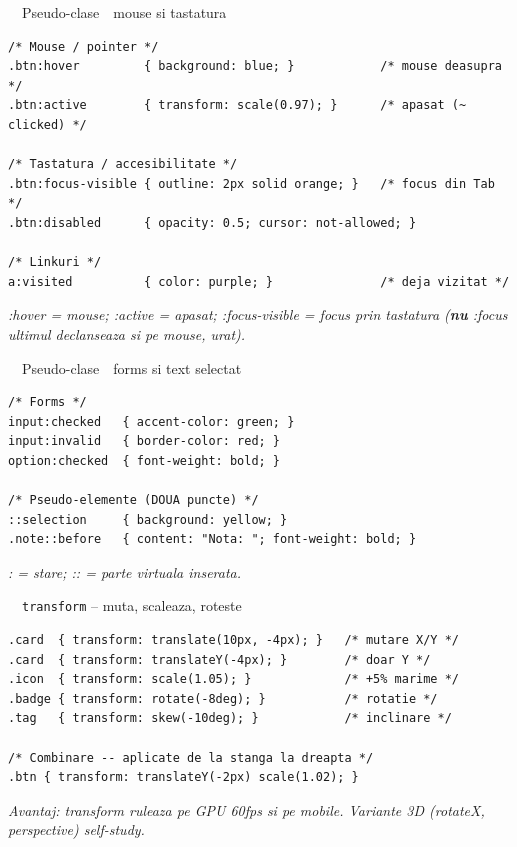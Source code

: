 \documentclass[aspectratio=169,11pt]{beamer}
\newcommand{\code}[1]{{\ttfamily\small\color{accent!85!black}#1}}
\begin{document}
\begin{frame}[fragile]{\textcolor{themeCss}{\faPaintBrush}\ \ Pseudo-clase \,\textendash\, mouse si tastatura}
\vspace{4pt}
\begin{lstlisting}[style=css, basicstyle=\ttfamily\scriptsize]
/* Mouse / pointer */
.btn:hover         { background: blue; }            /* mouse deasupra */
.btn:active        { transform: scale(0.97); }      /* apasat (~ clicked) */

/* Tastatura / accesibilitate */
.btn:focus-visible { outline: 2px solid orange; }   /* focus din Tab */
.btn:disabled      { opacity: 0.5; cursor: not-allowed; }

/* Linkuri */
a:visited          { color: purple; }               /* deja vizitat */
\end{lstlisting}

\vspace{2pt}
{\footnotesize\color{textDim}\itshape \code{:hover} = mouse; \code{:active} = apasat; \code{:focus-visible} = focus prin tastatura (\textbf{nu} \code{:focus} \textendash{} ultimul declanseaza si pe mouse, urat).}
\end{frame}

\begin{frame}[fragile]{\textcolor{themeCss}{\faPaintBrush}\ \ Pseudo-clase \,\textendash\, forms si text selectat}
\vspace{6pt}
\begin{lstlisting}[style=css, basicstyle=\ttfamily\scriptsize]
/* Forms */
input:checked   { accent-color: green; }
input:invalid   { border-color: red; }
option:checked  { font-weight: bold; }

/* Pseudo-elemente (DOUA puncte) */
::selection     { background: yellow; }
.note::before   { content: "Nota: "; font-weight: bold; }
\end{lstlisting}

\vspace{4pt}
{\footnotesize\color{textDim}\itshape \code{:} = stare; \code{::} = parte virtuala inserata.}
\end{frame}

\begin{frame}[fragile]{\textcolor{themeCss}{\faPaintBrush}\ \ \texttt{transform} -- muta, scaleaza, roteste}
\vspace{6pt}
\begin{lstlisting}[style=css, basicstyle=\ttfamily\scriptsize]
.card  { transform: translate(10px, -4px); }   /* mutare X/Y */
.card  { transform: translateY(-4px); }        /* doar Y */
.icon  { transform: scale(1.05); }             /* +5% marime */
.badge { transform: rotate(-8deg); }           /* rotatie */
.tag   { transform: skew(-10deg); }            /* inclinare */

/* Combinare -- aplicate de la stanga la dreapta */
.btn { transform: translateY(-2px) scale(1.02); }
\end{lstlisting}
\vspace{4pt}
{\footnotesize\color{textDim}\itshape Avantaj: \code{transform} ruleaza pe GPU \textendash{} 60fps si pe mobile. Variante 3D (\code{rotateX}, \code{perspective}) \textendash{} self-study.}
\end{frame}
\end{document}
